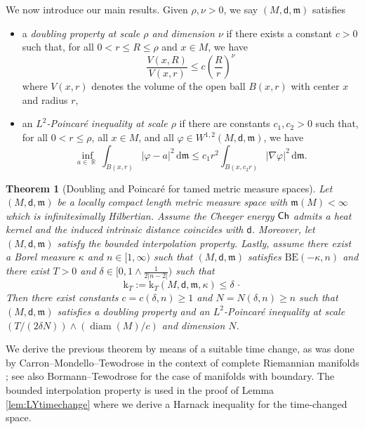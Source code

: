\documentclass[10pt]{article}
\newcommand{\m}{\mathfrak{m}}
\newcommand{\M}{{\mathit{M}}}
\DeclareMathOperator{\diam}{diam}
\renewcommand{\d}{\,\mathrm{d}}
\renewcommand{\k}{\mathrm{k}}
\newcommand{\dist}{\mathsf{d}}
\newcommand{\Ch}{{\sf Ch}}
\DeclareMathOperator{\RR}{\mathbb{R}}
\newcommand{\BE}{{\mathrm{BE}}}
\theoremstyle{plain}
\newtheorem{theorem}{Theorem}[section]
\theoremstyle{definition}
\begin{document}
We now introduce our main results. Given $\rho,\nu>0$, we say $(\M,\dist,\m)$ satisfies
\begin{itemize}
    \item a \emph{doubling property at scale $\rho$ and dimension $\nu$} if there exists a constant $c>0$ such that, for all $0<r\leq R\leq \rho $ and $x\in \M$, we have
    \[
    \frac{V(x,R)}{V(x,r)}\leq c\left(\frac{R}{r}\right)^{\nu}
    \]
    where $V(x,r)$ denotes the volume of the open ball $B(x,r)$ with center $x$ and radius $r$,
    \item an \emph{$L^2$-Poincaré inequality at scale $\rho$} if there are constants $c_1,c_2>0$ such that, for all $0<r\leq \rho$, all $x\in \M$, and all $\varphi\in W^{1,2}(\M,\dist,\m)$, we have 
    \[
    \inf_{a\in\RR}\int_{B(x,r)}|\varphi-a|^2\d\m\leq c_1r^2\int_{B(x,c_2 r)}|\nabla\varphi|^2\d\m.
    \]
    \end{itemize}



\begin{theorem}[Doubling and Poincaré for tamed metric measure spaces]\label{thm:MainA} 
Let $(\M,\dist,\m)$ be a locally compact length metric measure space with $\m(M)<\infty$ which is infinitesimally Hilbertian. Assume the Cheeger energy $\Ch$ admits a heat kernel and the induced intrinsic distance coincides with $\dist$. Moreover, let $(\M,\dist,\m)$ satisfy the bounded interpolation property. Lastly, assume there exist a Borel measure $\kappa$ and $n\in [1,\infty)$ such that $(\M,\dist,\m)$ satisfies $\BE(-\kappa,n)$ and there exist $T>0$ and $\delta \in [0, 1\wedge \frac{1}{2|n-2|})$ such that
\begin{equation*}
\k_T:=\k_T(\M,\dist,\m,\kappa) \le \delta \, \cdot 
\end{equation*}
Then there exist constants $c=c(\delta,n)\geq 1$ and $N = N(\delta,n) \geq n$ such that $(M,\dist,\m)$ satisfies a doubling property and an $L^2$-Poincaré inequality at scale $(T/(2\delta N))\wedge (\diam(\M)/c)$ and dimension $N$.
\end{theorem}


We derive the previous theorem by means of a suitable time change, as was done by Carron--Mondello--Tewodrose in the context of complete Riemannian manifolds \cite{CMT_KatoBE}; see also Bormann--Tewodrose \cite{BormannTewodrose} for the case of manifolds with boundary. The bounded interpolation property is used in the proof of Lemma \ref{lem:LYtimechange} where we derive a Harnack inequality for the time-changed space.
\end{document}

